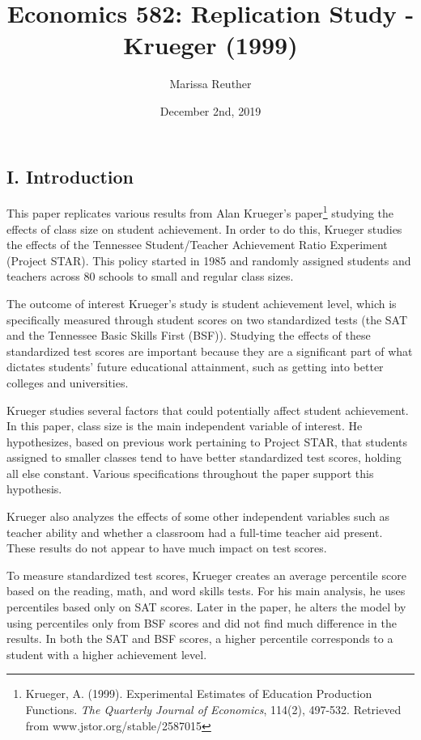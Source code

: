 \documentclass[a4paper,11pt]{article}
\begin{document}
\title{Economics 582: Replication Study - Krueger (1999)}
\author{Marissa Reuther}
\date{December 2nd, 2019}
\maketitle

\subsection*{I. Introduction}
This paper replicates various results from Alan Krueger's paper\footnote{Krueger, A. (1999). Experimental Estimates of Education Production Functions. \textit{The Quarterly Journal of Economics}, 114(2), 497-532. Retrieved from www.jstor.org/stable/2587015}  studying the effects of class size on student achievement. In order to do this, Krueger studies the effects of the Tennessee Student/Teacher Achievement Ratio Experiment (Project STAR). This policy started in 1985 and randomly assigned students and teachers across 80 schools to small and regular class sizes. \par

The outcome of interest Krueger’s study is student achievement level, which is specifically measured through student scores on two standardized tests (the SAT and the Tennessee Basic Skills First (BSF)). Studying the effects of these standardized test scores are important because they are a significant part of what dictates students’ future educational attainment, such as getting into better colleges and universities.  \par

Krueger studies several factors that could potentially affect student achievement. In this paper, class size is the main independent variable of interest. He hypothesizes, based on previous work pertaining to Project STAR, that students assigned to smaller classes tend to have better standardized test scores, holding all else constant. Various specifications throughout the paper support this hypothesis. \par

Krueger also analyzes the effects of some other independent variables such as teacher ability and whether a classroom had a full-time teacher aid present. These results do not appear to have much impact on test scores. \par

To measure standardized test scores, Krueger creates an average percentile score based on the reading, math, and word skills tests. For his main analysis, he uses percentiles based only on SAT scores. Later in the paper, he alters the model by using percentiles only from BSF scores and did not find much difference in the results. In both the SAT and BSF scores, a higher percentile corresponds to a student with a higher achievement level. \par
\end{document}
